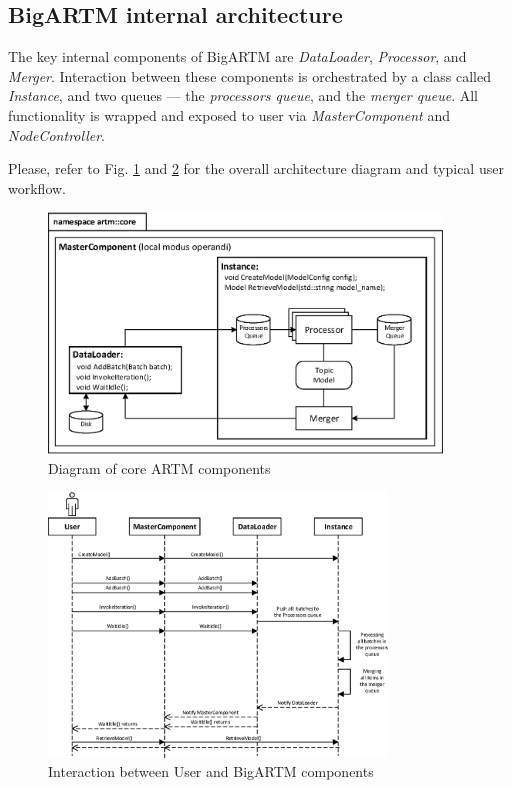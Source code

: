 \documentclass[11pt,a4paper,twoside]{report}
\begin{document}
\subsection{BigARTM internal architecture}

The key internal components of BigARTM are \emph{DataLoader}, \emph{Processor}, and \emph{Merger}.
Interaction between these components is orchestrated by a class called \emph{Instance},
and two queues --- the \emph{processors queue}, and the \emph{merger queue}.
All functionality is wrapped and exposed to user via \emph{MasterComponent} and \emph{NodeController}.

Please, refer to Fig. \ref{fig:diagramm_artm_core} and \ref{fig:diagramm_workflow}
for the overall architecture diagram and typical user workflow.

\begin{figure}[h!]
\begin{centering}
\includegraphics[height=64mm]{diagramm_artm_core.eps}
\caption{Diagram of core ARTM components}
\label{fig:diagramm_artm_core}
\end{centering}
\end{figure}
\vspace{1ex}

\begin{figure}[h!]
\begin{centering}
\includegraphics[width=90mm]{diagramm_workflow.eps}
\caption{Interaction between User and BigARTM components}
\label{fig:diagramm_workflow}
\end{centering}
\end{figure}
\end{document}

